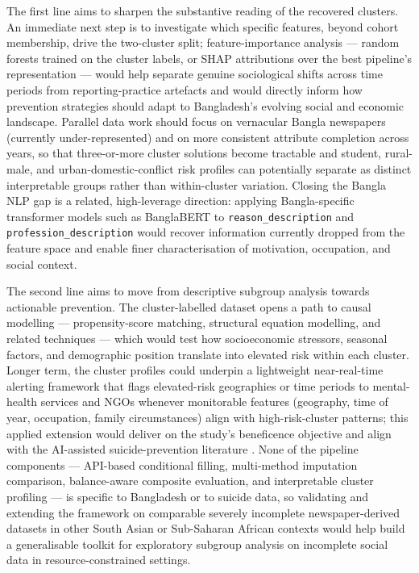 The first line aims to sharpen the substantive reading of the recovered clusters. An immediate next step is to investigate which specific features, beyond cohort membership, drive the two-cluster split; feature-importance analysis --- random forests trained on the cluster labels, or SHAP attributions over the best pipeline's representation --- would help separate genuine sociological shifts across time periods from reporting-practice artefacts and would directly inform how prevention strategies should adapt to Bangladesh's evolving social and economic landscape. Parallel data work should focus on vernacular Bangla newspapers (currently under-represented) and on more consistent attribute completion across years, so that three-or-more cluster solutions become tractable and student, rural-male, and urban-domestic-conflict risk profiles can potentially separate as distinct interpretable groups rather than within-cluster variation. Closing the Bangla NLP gap is a related, high-leverage direction: applying Bangla-specific transformer models such as BanglaBERT \cite{ref47} to \texttt{reason\_description} and \texttt{profession\_description} would recover information currently dropped from the feature space and enable finer characterisation of motivation, occupation, and social context.

The second line aims to move from descriptive subgroup analysis towards actionable prevention. The cluster-labelled dataset opens a path to causal modelling --- propensity-score matching, structural equation modelling, and related techniques \cite{ref48} --- which would test how socioeconomic stressors, seasonal factors, and demographic position translate into elevated risk within each cluster. Longer term, the cluster profiles could underpin a lightweight near-real-time alerting framework that flags elevated-risk geographies or time periods to mental-health services and NGOs whenever monitorable features (geography, time of year, occupation, family circumstances) align with high-risk-cluster patterns; this applied extension would deliver on the study's beneficence objective and align with the AI-assisted suicide-prevention literature \cite{ref43,ref44,ref53}. None of the pipeline components --- API-based conditional filling, multi-method imputation comparison, balance-aware composite evaluation, and interpretable cluster profiling --- is specific to Bangladesh or to suicide data, so validating and extending the framework on comparable severely incomplete newspaper-derived datasets in other South Asian or Sub-Saharan African contexts \cite{ref23} would help build a generalisable toolkit for exploratory subgroup analysis on incomplete social data in resource-constrained settings.

